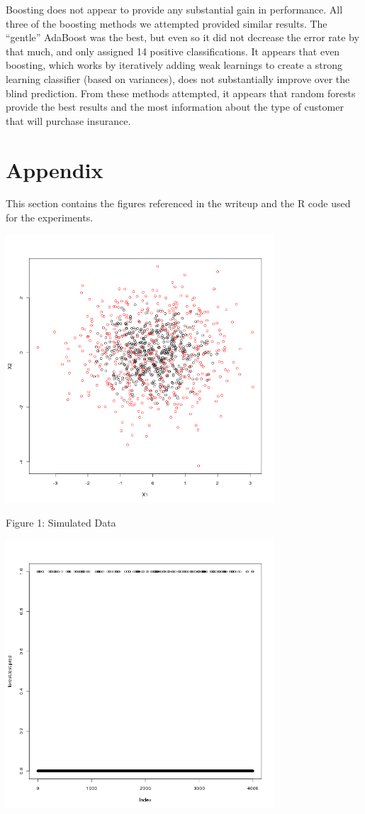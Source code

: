 \documentclass[a4paper,10pt]{article}
\begin{document}
Boosting does not appear to provide any substantial gain in performance. All three of the boosting
methods we attempted provided similar results. The ``gentle'' AdaBoost was the best, but even so
it did not decrease the error rate by that much, and only assigned 14 positive classifications. It
appears that even boosting, which works by iteratively adding weak learnings to create a strong learning
classifier (based on variances), does not substantially improve over the blind prediction. From
these methods attempted, it appears that random forests provide the best results and the most information
about the type of customer that will purchase insurance.

\section{Appendix}

This section contains the figures referenced in the writeup and the R code used for the experiments.


\includegraphics[width=100mm]{simulated_classes.png}

Figure 1: Simulated Data

\includegraphics[width=100mm]{random_forest.png}
\end{document}
